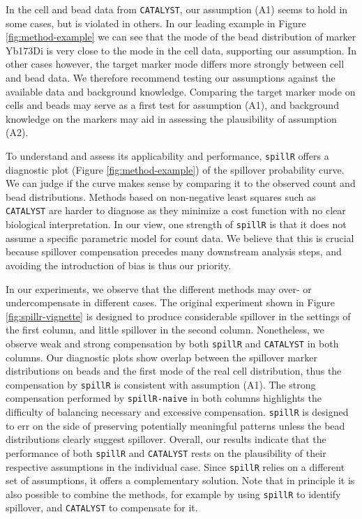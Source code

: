 \documentclass{bioinfo}
\begin{document}
In the cell and bead data from \texttt{CATALYST}, our assumption (A1)
seems to hold in some cases, but is violated in others. In our leading
example in Figure \ref{fig:method-example} we can see that the mode of
the bead distribution of marker Yb173Di is very close to the mode in the
cell data, supporting our assumption. In other cases however, the target
marker mode differs more strongly between cell and bead data. We
therefore recommend testing our assumptions against the available data
and background knowledge. Comparing the target marker mode on cells and
beads may serve as a first test for assumption (A1), and background
knowledge on the markers may aid in assessing the plausibility of
assumption (A2).

To understand and assess its applicability and performance,
\texttt{spillR} offers a diagnostic plot (Figure
\ref{fig:method-example}) of the spillover probability curve. We can
judge if the curve makes sense by comparing it to the observed count and
bead distributions. Methods based on non-negative least squares such as
\texttt{CATALYST} are harder to diagnose as they minimize a cost
function with no clear biological interpretation. In our view, one
strength of \texttt{spillR} is that it does not assume a specific
parametric model for count data. We believe that this is crucial because
spillover compensation precedes many downstream analysis steps, and
avoiding the introduction of bias is thus our priority.

In our experiments, we observe that the different methods may over- or
undercompensate in different cases. The original experiment shown in
Figure \ref{fig:spillr-vignette} is designed to produce considerable
spillover in the settings of the first column, and little spillover in
the second column. Nonetheless, we observe weak and strong compensation
by both \texttt{spillR} and \texttt{CATALYST} in both columns. Our
diagnostic plots show overlap between the spillover marker distributions
on beads and the first mode of the real cell distribution, thus the
compensation by \texttt{spillR} is consistent with assumption (A1). The
strong compensation performed by \texttt{spillR-naive} in both columns
highlights the difficulty of balancing necessary and excessive
compensation. \texttt{spillR} is designed to err on the side of
preserving potentially meaningful patterns unless the bead distributions
clearly suggest spillover. Overall, our results indicate that the
performance of both \texttt{spillR} and \texttt{CATALYST} rests on the
plausibility of their respective assumptions in the individual case.
Since \texttt{spillR} relies on a different set of assumptions, it
offers a complementary solution. Note that in principle it is also
possible to combine the methods, for example by using \texttt{spillR} to
identify spillover, and \texttt{CATALYST} to compensate for it.
\end{document}
